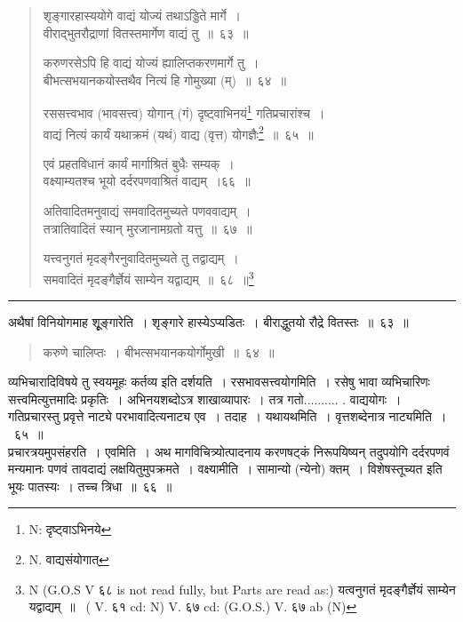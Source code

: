 \documentclass[11pt, openany]{book}
\begin{document}
\newpage

\begin{quote}
{\na  शृङ्गारहास्ययोगे वाद्यं योज्यं तथाऽड्डिते मार्गे~।\\
 वीराद्भुतरौद्राणां वितस्तमार्गेण वाद्यं तु~॥~६३~॥

 करुणरसेऽपि हि वाद्यं योज्यं ह्यालिप्तकरणमार्गे तु~।\\
 बीभत्सभयानकयोस्तथैव नित्यं हि गोमुख्या (म्)~॥~६४~॥

 रससत्त्वभाव (भावसत्त्व) योगान् (गं) दृष्ट्वाभिनयं\renewcommand{\thefootnote}{1}\footnote{N: दृष्ट्वाऽभिनये} गतिप्रचारांश्च~।\\
 वाद्यं नित्यं कार्यं यथाक्रमं (यथं) वाद्य (वृत्त) योगज्ञैः\renewcommand{\thefootnote}{2}\footnote{N. वाद्यसंयोगात्}~॥~६५~॥

 एवं प्रहतविधानं कार्यं मार्गाश्रितं बुधैः सम्यक्~।\\
 वक्ष्याम्यतश्च भूयो दर्दरपणवाश्रितं वाद्यम्~।६६~॥

 अतिवादितमनुवाद्यं समवादितमुच्यते पणववाद्यम्~।\\
 तत्रातिवादितं स्यान् मुरजानामग्रतो यत्तु~॥~६७~॥

 यत्त्वनुगतं मृदङ्गैरनुवादितमुच्यते तु तद्वाद्यम्~।\\
 समवादितं मृदङ्गैर्ज्ञेयं साम्येन यद्वाद्यम्~॥~६८~॥\renewcommand{\thefootnote}{3}\footnote{N (G.O.S V ६८ is not read fully, but Parts are read as:) यत्वनुगतं मृदङ्गैर्ज्ञेयं साम्येन यद्वाद्यम्~॥~ ( V. ६१ cd: N) V. ६७ cd: (G.O.S.) V. ६७ ab (N)} }
\end{quote}

\hrule

\vspace{2mm}
अथैषां विनियोगमाह शूृङ्गारेति~। शृङ्गारे हास्येऽप्यडितः~। {\qtt बीराद्धुतयो} रौद्रे वितस्तः~॥~६३~॥

\begin{quote}
{\qt  करुणे चालिप्तः~। बीभत्सभयानकयोर्गोमुखी~॥~६४~॥}
\end{quote}

व्यभिचारादिविषये तु स्वयमूहः कर्तव्य इति दर्शयति~। {\qtt रसभावसत्त्वयोगमिति}~। रसेषु भावा व्यभिचारिणः सत्त्वमित्युत्तमादिः प्रकृतिः~। अभिनयशब्दोऽत्र {\qtt शाखाव्यापारः}~। तत्र गतो.......... . वाद्ययोगः~। गतिप्रचारस्तु प्रवृत्ते नाट्ये परभावादित्यनाट्य एव~। {\qtt तदाह}~। {\qtt यथायथमिति}~। वृत्तशब्देनात्र नाट्यमिति~।~६५~॥\\

{\qtt प्रचारत्रयमुपसंहरति}~। {\qtt एवमिति}~। अथ मागविचित्र्योत्पादनाय करणषट्कं निरूपयिष्यन् तदुपयोगि दर्दरपणवं मन्यमानः पणवं तावदाद्यं लक्षयितुमुपक्रमते~। {\qtt वक्ष्यामीति}~। सामान्यो (न्येनो) क्तम्~। विशेषस्तूच्यत इति भूयः पातस्यः~। तच्च त्रिधा~॥~६६~॥\\
\end{document}
